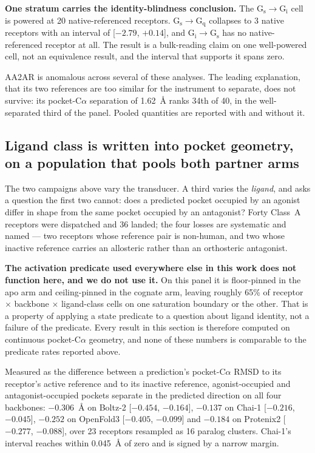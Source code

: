 \textbf{One stratum carries the identity-blindness conclusion.} The
G$_\mathrm{s}\rightarrow$G$_\mathrm{i}$ cell is powered at 20 native-referenced
receptors. G$_\mathrm{s}\rightarrow$G$_\mathrm{q}$ collapses to 3 native
receptors with an interval of [$-2.79$, $+0.14$], and
G$_\mathrm{i}\rightarrow$G$_\mathrm{s}$ has no native-referenced receptor at all.
The result is a bulk-reading claim on one well-powered cell, not an equivalence
result, and the interval that supports it spans zero.

AA2AR is anomalous across several of these analyses. The leading explanation,
that its two references are too similar for the instrument to separate, does not
survive: its pocket-C$\alpha$ separation of 1.62~\AA{} ranks 34th of 40, in the
well-separated third of the panel. Pooled quantities are reported with and
without it.

\subsection*{Ligand class is written into pocket geometry, on a population that pools both partner arms}

The two campaigns above vary the transducer. A third varies the
\emph{ligand}, and asks a question the first two cannot: does a predicted
pocket occupied by an agonist differ in shape from the same pocket occupied
by an antagonist? Forty Class~A receptors were dispatched and 36 landed;
the four losses are systematic and named --- two receptors whose reference
pair is non-human, and two whose inactive reference carries an allosteric
rather than an orthosteric antagonist.

\textbf{The activation predicate used everywhere else in this work does not
function here, and we do not use it.} On this panel it is floor-pinned in the
apo arm and ceiling-pinned in the cognate arm, leaving roughly 65\% of
receptor $\times$ backbone $\times$ ligand-class cells on one saturation
boundary or the other. That is a property of applying a state predicate to a
question about ligand identity, not a failure of the predicate. Every result
in this section is therefore computed on continuous pocket-C$\alpha$ geometry,
and none of these numbers is comparable to the predicate rates reported above.

Measured as the difference between a prediction's pocket-C$\alpha$ RMSD to its
receptor's active reference and to its inactive reference, agonist-occupied
and antagonist-occupied pockets separate in the predicted direction on all four
backbones: $-0.306$~\AA{} on Boltz-2 [$-0.454$, $-0.164$], $-0.137$ on Chai-1
[$-0.216$, $-0.045$], $-0.252$ on OpenFold3 [$-0.405$, $-0.099$] and $-0.184$
on Protenix2 [$-0.277$, $-0.088$], over 23 receptors resampled as 16 paralog
clusters. Chai-1's interval reaches within 0.045~\AA{} of zero and is signed by
a narrow margin.

